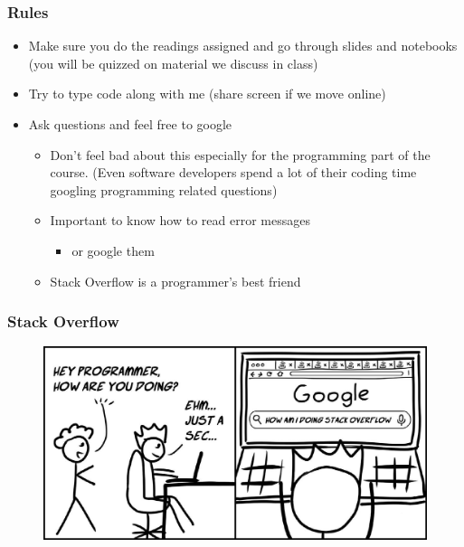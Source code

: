 \documentclass[compress, aspectratio=54]{beamer}
\begin{document}
\begin{frame}
\frametitle{Rules}
\begin{itemize}
\item Make sure you do the readings assigned and go through slides and notebooks (you will be quizzed on material we discuss in class)

\item Try to type code along with me (share screen if we move online)
\item Ask questions and feel free to google
\begin{itemize}
\item Don't feel bad about this especially for the programming part of the course. (Even software developers spend a lot of their coding time googling programming related questions)
\item Important to know how to read error messages
\begin{itemize}

\item or google them
\end{itemize}
\item Stack Overflow is a programmer's best friend
\end{itemize}
\end{itemize}
\end{frame}


\begin{frame}
\frametitle{Stack Overflow}

\begin{figure}

\includegraphics[width=0.6\linewidth ]{Figures/stack-overflow.jpeg}
\end{figure}

\end{frame}
\end{document}
